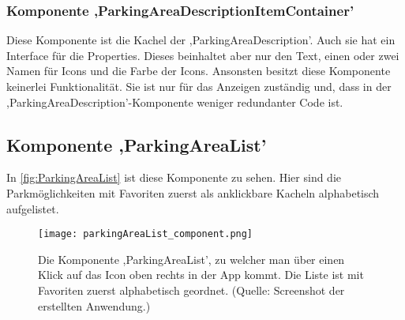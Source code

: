 \subsubsection{Komponente ,ParkingAreaDescriptionItemContainer'}
\label{parkingAreaDescriptionItemContainer}
Diese Komponente ist die Kachel der ,ParkingAreaDescription'. Auch sie hat ein Interface für die Properties. Dieses beinhaltet aber nur den Text, einen oder zwei Namen für Icons und die Farbe der Icons. Ansonsten besitzt diese Komponente keinerlei Funktionalität. Sie ist nur für das Anzeigen zuständig und, dass in der ,ParkingAreaDescription'-Komponente weniger redundanter Code ist.

\subsection{Komponente ,ParkingAreaList'}
\label{parkingAreaList}
In \autoref{fig:ParkingAreaList} ist diese Komponente zu sehen. Hier sind die Parkmöglichkeiten mit Favoriten zuerst als anklickbare Kacheln alphabetisch aufgelistet. 
\begin{figure}[h!]
	\centering
	\texttt{[image: parkingAreaList\_component.png]}
	\caption[Die Komponente ,ParkingAreaList', zu welcher man über einen Klick auf das Icon oben rechts in der App kommt. Die Liste ist mit Favoriten zuerst alphabetisch geordnet.]
	{Die Komponente ,ParkingAreaList', zu welcher man über einen Klick auf das Icon oben rechts in der App kommt. Die Liste ist mit Favoriten zuerst alphabetisch geordnet. (Quelle: Screenshot der erstellten Anwendung.)}
	\label{fig:ParkingAreaList}
\end{figure}

